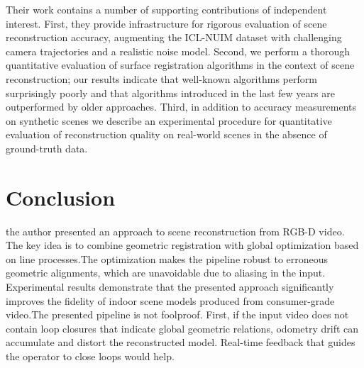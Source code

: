 \documentclass[10pt,twocolumn,letterpaper]{article}
\begin{document}
Their work contains a number of supporting contributions of independent interest. First, they provide infrastructure for rigorous evaluation of scene reconstruction accuracy, augmenting the ICL-NUIM dataset\cite{Handa2014A} with challenging camera trajectories and a realistic noise model. Second, we perform a thorough quantitative evaluation of surface registration algorithms in the context of scene reconstruction; our results indicate that well-known algorithms perform surprisingly poorly and that algorithms introduced in the last few years are outperformed by older approaches. Third, in addition to accuracy measurements on synthetic scenes we describe an experimental procedure for quantitative evaluation of reconstruction quality on real-world scenes in the absence of ground-truth data.
\section{Conclusion}
the author presented an approach to scene reconstruction from RGB-D video. The key idea is to combine geometric registration with global optimization based on line processes.The optimization makes the pipeline robust to erroneous geometric alignments, which are unavoidable due to aliasing in the input. Experimental results demonstrate that the presented approach significantly improves the fidelity of indoor scene models produced from consumer-grade video.The presented pipeline is not foolproof. First, if the input video does not contain loop closures that indicate global geometric relations, odometry drift can accumulate and distort the reconstructed model. Real-time feedback that guides the operator to close loops would help. 


{\small


}
\end{document}
